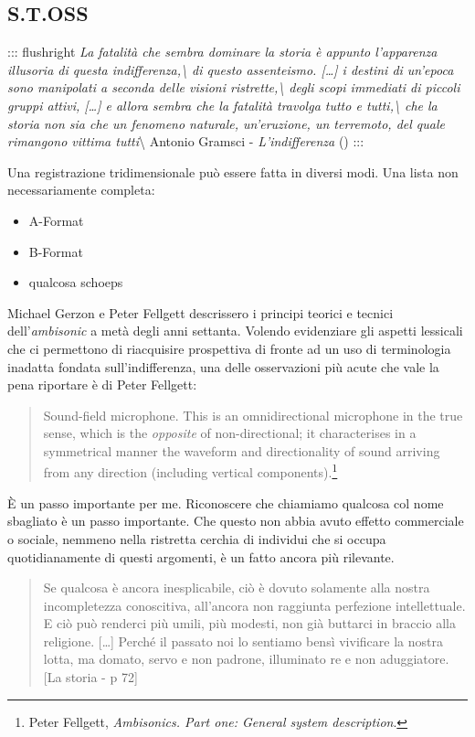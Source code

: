 \documentclass[a4paper,11pt]{article}
\begin{document}
\subsection{S.T.OSS}\hypertarget{stoss}{}\label{stoss}

::: flushright
\emph{La fatalità che sembra dominare la storia è appunto l'apparenza
illusoria di questa indifferenza,\textbackslash{}
di questo assenteismo. {[}\ldots{}{]} i destini di un'epoca sono manipolati a
seconda delle visioni ristrette,\textbackslash{}
degli scopi immediati di piccoli gruppi attivi, {[}\ldots{}{]} e allora sembra
che la fatalità travolga tutto e tutti,\textbackslash{}
che la storia non sia che un fenomeno naturale, un'eruzione, un
terremoto, del quale rimangono vittima tutti}\textbackslash{}
Antonio Gramsci - \emph{L'indifferenza} ()
:::

Una registrazione tridimensionale può essere fatta in diversi modi. Una
lista non necessariamente completa:

\begin{itemize}
\item{} A-Format
\item{} B-Format
\item{} qualcosa schoeps
\end{itemize}

Michael Gerzon e Peter Fellgett descrissero i principi teorici e tecnici
dell'\emph{ambisonic} a metà degli anni settanta. Volendo evidenziare gli
aspetti lessicali che ci permettono di riacquisire prospettiva di fronte
ad un uso di terminologia inadatta fondata sull'indifferenza, una delle
osservazioni più acute che vale la pena riportare è di Peter Fellgett:

\begin{quote}
Sound-field microphone. This is an omnidirectional microphone in the
true sense, which is the \emph{opposite} of non-directional; it
characterises in a symmetrical manner the waveform and directionality
of sound arriving from any direction (including vertical
components).\footnote{Peter Fellgett, \emph{Ambisonics. Part one: General system
description}.}
\end{quote}

È un passo importante per me. Riconoscere che chiamiamo qualcosa col
nome sbagliato è un passo importante. Che questo non abbia avuto effetto
commerciale o sociale, nemmeno nella ristretta cerchia di individui che
si occupa quotidianamente di questi argomenti, è un fatto ancora più
rilevante.

\begin{quote}
Se qualcosa è ancora inesplicabile, ciò è dovuto solamente alla nostra
incompletezza conoscitiva, all'ancora non raggiunta perfezione
intellettuale. E ciò può renderci più umili, più modesti, non già
buttarci in braccio alla religione. {[}\ldots{}{]} Perché il passato noi lo
sentiamo bensì vivificare la nostra lotta, ma domato, servo e non
padrone, illuminato re e non aduggiatore. {[}La storia - p 72{]}
\end{quote}
\end{document}

